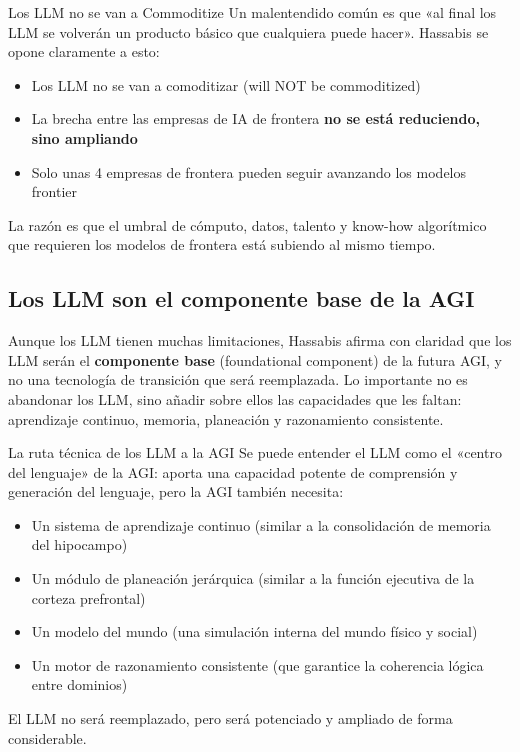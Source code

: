 \documentclass[a4paper]{article}
\begin{document}
\begin{warningbox}{Los LLM no se van a Commoditize}
Un malentendido común es que «al final los LLM se volverán un producto básico que cualquiera puede hacer». Hassabis se opone claramente a esto:
\begin{itemize}
    \item Los LLM no se van a comoditizar (will NOT be commoditized)
    \item La brecha entre las empresas de IA de frontera \textbf{no se está reduciendo, sino ampliando}
    \item Solo unas 4 empresas de frontera pueden seguir avanzando los modelos frontier
\end{itemize}
La razón es que el umbral de cómputo, datos, talento y know-how algorítmico que requieren los modelos de frontera está subiendo al mismo tiempo.
\end{warningbox}

\subsection{Los LLM son el componente base de la AGI}

Aunque los LLM tienen muchas limitaciones, Hassabis afirma con claridad que los LLM serán el \textbf{componente base} (foundational component) de la futura AGI, y no una tecnología de transición que será reemplazada. Lo importante no es abandonar los LLM, sino añadir sobre ellos las capacidades que les faltan: aprendizaje continuo, memoria, planeación y razonamiento consistente.

\begin{knowledgebox}{La ruta técnica de los LLM a la AGI}
Se puede entender el LLM como el «centro del lenguaje» de la AGI: aporta una capacidad potente de comprensión y generación del lenguaje, pero la AGI también necesita:
\begin{itemize}
    \item Un sistema de aprendizaje continuo (similar a la consolidación de memoria del hipocampo)
    \item Un módulo de planeación jerárquica (similar a la función ejecutiva de la corteza prefrontal)
    \item Un modelo del mundo (una simulación interna del mundo físico y social)
    \item Un motor de razonamiento consistente (que garantice la coherencia lógica entre dominios)
\end{itemize}
El LLM no será reemplazado, pero será potenciado y ampliado de forma considerable.
\end{knowledgebox}
\end{document}
